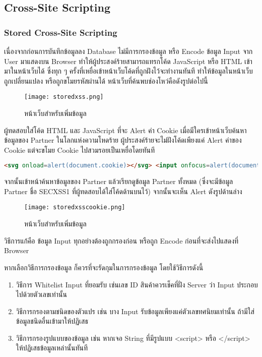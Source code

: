 \subsection{Cross-Site Scripting}

\subsubsection{Stored Cross-Site Scripting}

เนื่องจากก่อนการบันทึกข้อมูลลง Database ไม่มีการกรองข้อมูล หรือ Encode ข้อมูล Input จาก User มาแสดงบน Browser ทำให้ผู้ประสงค์ร้ายสามารถแทรกโค้ด JavaScript หรือ HTML เข้ามาในหน้าเว็บได้ ซึ่งทุก ๆ ครั้งที่เหยื่อเข้าหน้าเว็บโค้ดที่ถูกฝังไว้จะทำงานทันที ทำให้ข้อมูลในหน้าเว็บถูกเปลี่ยนแปลง หรือถูกขโมยรหัสผ่านได้ หน้าเว็บที่ค้นพบช่องโหว่คือดังรูปต่อไปนี้

\begin{figure}[h]
	\centering
	\texttt{[image: storedxss.png]}
	\caption{หน้าเว็บสำหรับเพิ่มข้อมูล}
	\label{Fig:storedxss.png}
\end{figure}

ผู้ทดสอบใส่โค้ด HTML และ JavaScript ที่จะ Alert ค่า Cookie เมื่อมีใครเข้าหน้าเว็บค้นหาข้อมูลของ Partner ในโลกแห่งความโหดร้าย ผู้ประสงค์ร้ายจะไม่ฝังโค้ดเพียงแค่ Alert ค่าของ Cookie แต่จะขโมย Cookie ไปสวมรอยเป็นเหยื่อโดยทันที

 \begin{lstlisting}[language=html,numbers=none] 
<svg onload=alert(document.cookie)></svg> <input onfocus=alert(document.cookie) autofocus>
\end{lstlisting}

จากนั้นเข้าหน้าค้นหาข้อมูลของ Partner แล้วเรียกดูข้อมูล Partner ทั้งหมด (ซึ่งจะมีข้อมูล Partner ชื่อ SECXSS1 ที่ผู้ทดสอบได้ใส่โค้ดด้านบนไว้) จากนั้นจะเห็น Alert ดังรูปด้านล่าง

\begin{figure}[h]
	\centering
	\texttt{[image: storedxsscookie.png]}
	\caption{หน้าเว็บสำหรับเพิ่มข้อมูล}
	\label{Fig:storedxsscookie.png}
\end{figure}

วิธีการแก้คือ ข้อมูล Input ทุกอย่างต้องถูกกรองก่อน หรือถูก Encode ก่อนที่จะส่งไปแสดงที่ Browser

หากเลือกวิธีการกรองข้อมูล ก็ควรที่จะรัดกุมในการกรองข้อมูล โดยใช้วิธีการดังนี้

\begin{enumerate}
	\item วิธีการ Whitelist Input ที่ยอมรับ เช่นเลข ID สินค้าควรเช็คที่ฝั่ง Server ว่า Input ประกอบไปด้วยตัวเลขเท่านั้น
	\item วิธีการกรองตามชนิดของตัวแปร เช่น บาง Input รับข้อมูลเพียงแค่ตัวเลขทศนิยมเท่านั้น ถ้ามีใส่ข้อมูลชนิดอื่นเข้ามาให้ปฏิเสธ
	\item วิธีการกรองรูปแบบของข้อมูล เช่น หากเจอ String ที่มีรูปแบบ <script> หรือ </script> ให้ปฏิเสธข้อมูลเหล่านั้นทันที
\end{enumerate}


